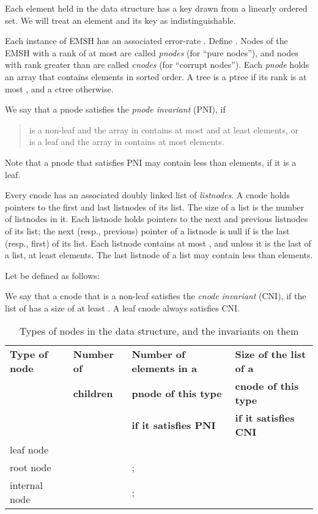 Each element held in the data structure has a key drawn from a 
	linearly ordered set. 
We will treat an element and its key as indistinguishable.

Each instance of EMSH has an associated error-rate . 
Define .
Nodes of the EMSH with a rank of at most  are called {\em pnodes} (for ``pure nodes''), and 
	nodes with rank greater than  are called {\em cnodes} (for ``corrupt nodes'').
Each {\em pnode} holds an array that contains elements in sorted order.
A tree is a ptree if its rank is at most , and a ctree otherwise.

We say that a pnode  satisfies the \emph{pnode invariant} (PNI), if 
\begin{quote}
	 is a non-leaf and the array in  contains at most 
	 and at least  elements, or \\
	 is a leaf and the array in  contains at most 
	 elements.
\end{quote}
Note that a pnode that satisfies PNI may contain less than  elements,
	if it is a leaf.

Every cnode has an associated doubly linked list of {\em listnodes}. 
A cnode holds pointers to the first and last listnodes of its list. 
The size of a list is the number of listnodes in it. 
Each listnode holds pointers to the next and previous
	listnodes of its list; the next (resp., previous)
        pointer of a listnode  is null if   is the last (resp., first)
        of its list.
Each listnode contains at most , and unless it is the last of a list,
	at least   elements. 
The last listnode of a list may contain less than  elements.

Let  be defined as follows:


We say that a cnode  that is a non-leaf  
	satisfies the \emph{cnode invariant} (CNI), if 
	the list of  has a size of at least . 
A leaf cnode always satisfies CNI. 
	

\begin{table}
\begin{center}
            \begin{tabular}{|l|l|l|l|}
\cline{1-4} \hline
 {\bf Type of node} & {\bf Number of} & {\bf Number of elements in a} & {\bf Size of the list of a} \\
              & {\bf children} & {\bf pnode of this type} & {\bf cnode of this type} \\
              &          & {\bf if it satisfies PNI} & {\bf if it satisfies CNI} \\
\hline \hline
               leaf node &  &  &   \\
\hline
               root node &  & ;   &  \\
\hline
               internal node &  & ;  &   \\
\hline
            \end{tabular}
\caption{Types of nodes in the data structure, and the invariants on them}
\label{tab:data:structure:emsh}
\end{center}
\end{table}
 
